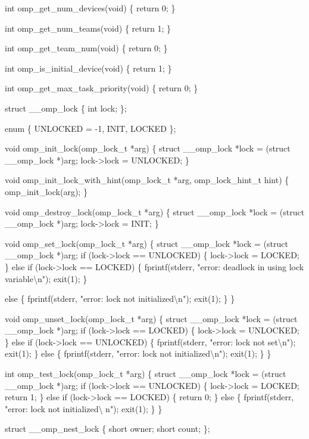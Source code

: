 {\begin{codepar}
int omp\_get\_num\_devices(void)
\{
    return 0;
\}

int omp\_get\_num\_teams(void)
\{
    return 1;
\}

int omp\_get\_team\_num(void)
\{
    return 0;
\}

int omp\_is\_initial\_device(void)
\{
    return 1;
\}

int omp\_get\_max\_task\_priority(void)
\{
    return 0;
\}

struct \_\_omp\_lock
\{
    int lock;
\};

enum \{ UNLOCKED = -1, INIT, LOCKED \};

void omp\_init\_lock(omp\_lock\_t *arg)
\{
    struct \_\_omp\_lock *lock = (struct \_\_omp\_lock *)arg;
    lock->lock = UNLOCKED;
\}

void omp\_init\_lock\_with\_hint(omp\_lock\_t *arg, omp\_lock\_hint\_t hint)
\{
    omp\_init\_lock(arg);
\}

void omp\_destroy\_lock(omp\_lock\_t *arg)
\{
    struct \_\_omp\_lock *lock = (struct \_\_omp\_lock *)arg;
    lock->lock = INIT;
\}

void omp\_set\_lock(omp\_lock\_t *arg)
\{
    struct \_\_omp\_lock *lock = (struct \_\_omp\_lock *)arg;
    if (lock->lock == UNLOCKED)
    \{
        lock->lock = LOCKED;
    \}
    else if (lock->lock == LOCKED)
    \{
        fprintf(stderr, "error: deadlock in using lock variable{\textbackslash}n");
        exit(1);
    \}

    else
    \{
        fprintf(stderr, "error: lock not initialized{\textbackslash}n");
        exit(1);
    \}
\}

void omp\_unset\_lock(omp\_lock\_t *arg)
\{
struct \_\_omp\_lock *lock = (struct \_\_omp\_lock *)arg;
    if (lock->lock == LOCKED)
    \{
        lock->lock = UNLOCKED;
    \}
    else if (lock->lock == UNLOCKED)
    \{
        fprintf(stderr, "error: lock not set{\textbackslash}n");
        exit(1);
    \}
    else
    \{
        fprintf(stderr, "error: lock not initialized{\textbackslash}n");
        exit(1);
    \}
\}

int omp\_test\_lock(omp\_lock\_t *arg)
\{
struct \_\_omp\_lock *lock = (struct \_\_omp\_lock *)arg;
    if (lock->lock == UNLOCKED)
    \{
        lock->lock = LOCKED;
        return 1;
    \}
    else if (lock->lock == LOCKED)
    \{
        return 0;
    \}
    else
    \{
        fprintf(stderr, "error: lock not initialized{\textbackslash} n");
        exit(1);
    \}
\}

struct \_\_omp\_nest\_lock
\{
    short owner;
    short count;
\};


\end{codepar}}

